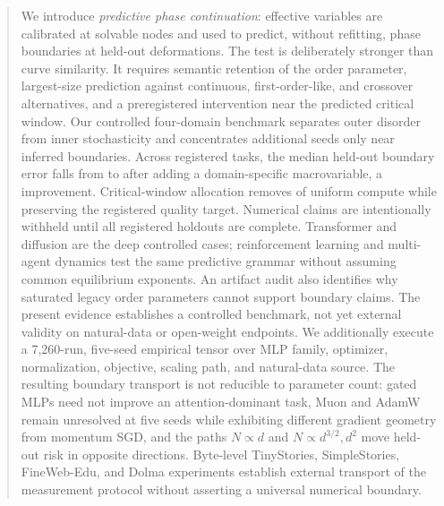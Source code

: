 \begin{abstract}
We introduce \emph{predictive phase continuation}: effective variables are
calibrated at solvable nodes and used to predict, without refitting, phase
boundaries at held-out deformations.  The test is deliberately stronger than
curve similarity.  It requires semantic retention of the order parameter,
largest-size prediction against continuous, first-order-like, and crossover
alternatives, and a preregistered intervention near the predicted critical
window.  Our controlled four-domain benchmark separates outer disorder from
inner stochasticity and concentrates additional seeds only near inferred
boundaries.  \ifnum{} Across \PredictiveRuns{} registered tasks,
the median held-out boundary error falls from \BaseMedianError{} to
\AugmentedMedianError{} after adding a domain-specific macrovariable, a
\BridgeImprovement{} improvement.  Critical-window allocation removes
\MeanComputeSaving{} of uniform compute while preserving the registered
quality target.  \else Numerical claims are intentionally withheld until all
registered holdouts are complete. \fi Transformer and diffusion are the deep
controlled cases; reinforcement learning and multi-agent dynamics test the
same predictive grammar without assuming common equilibrium exponents.  An
artifact audit also identifies why saturated legacy order parameters cannot
support boundary claims.  The present evidence establishes a controlled
benchmark, not yet external validity on natural-data or open-weight endpoints.
We additionally execute a 7,260-run, five-seed empirical tensor over MLP family,
optimizer, normalization, objective, scaling path, and natural-data source.
The resulting boundary transport is not reducible to parameter count: gated MLPs
need not improve an attention-dominant task, Muon and AdamW remain unresolved at
five seeds while exhibiting different gradient geometry from momentum SGD, and
the paths $N\propto d$ and $N\propto d^{3/2},d^2$ move held-out risk in opposite
directions.  Byte-level TinyStories, SimpleStories, FineWeb-Edu, and Dolma
experiments establish external transport of the measurement protocol without
asserting a universal numerical boundary.
\end{abstract}
